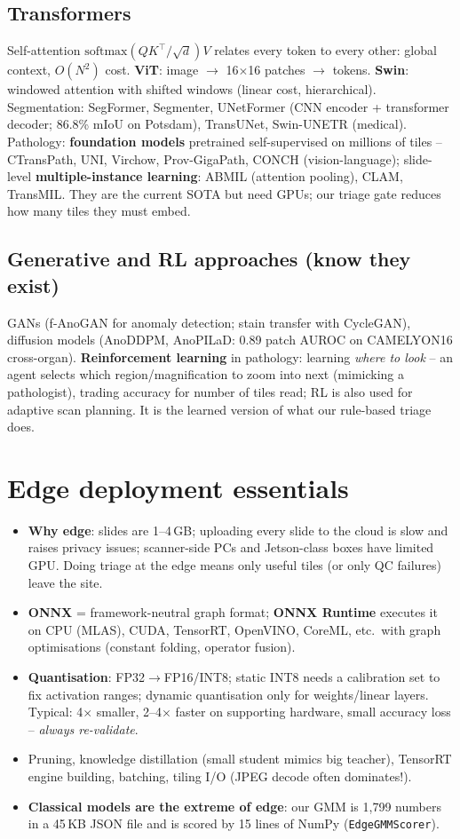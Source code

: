 \subsection{Transformers}
Self-attention $\mathrm{softmax}(QK^\top/\sqrt{d})V$ relates every token to every other: global context, $O(N^2)$ cost.
\textbf{ViT}: image $\to$ 16$\times$16 patches $\to$ tokens. \textbf{Swin}: windowed attention with shifted windows
(linear cost, hierarchical). Segmentation: SegFormer, Segmenter, UNetFormer (CNN encoder + transformer decoder;
86.8\% mIoU on Potsdam), TransUNet, Swin-UNETR (medical). Pathology: \textbf{foundation models} pretrained
self-supervised on millions of tiles -- CTransPath, UNI, Virchow, Prov-GigaPath, CONCH (vision-language); slide-level
\textbf{multiple-instance learning}: ABMIL (attention pooling), CLAM, TransMIL. They are the current SOTA but need GPUs;
our triage gate reduces how many tiles they must embed.

\subsection{Generative and RL approaches (know they exist)}
GANs (f-AnoGAN for anomaly detection; stain transfer with CycleGAN), diffusion models (AnoDDPM, AnoPILaD: 0.89 patch AUROC
on CAMELYON16 cross-organ). \textbf{Reinforcement learning} in pathology: learning \emph{where to look} -- an agent
selects which region/magnification to zoom into next (mimicking a pathologist), trading accuracy for number of tiles
read; RL is also used for adaptive scan planning. It is the learned version of what our rule-based triage does.

\section{Edge deployment essentials}
\begin{itemize}
\item \textbf{Why edge}: slides are 1--4\,GB; uploading every slide to the cloud is slow and raises privacy issues;
scanner-side PCs and Jetson-class boxes have limited GPU. Doing triage at the edge means only useful tiles (or only QC
failures) leave the site.
\item \textbf{ONNX} = framework-neutral graph format; \textbf{ONNX Runtime} executes it on CPU (MLAS), CUDA, TensorRT,
OpenVINO, CoreML, etc.\ with graph optimisations (constant folding, operator fusion).
\item \textbf{Quantisation}: FP32$\to$FP16/INT8; static INT8 needs a calibration set to fix activation ranges; dynamic
quantisation only for weights/linear layers. Typical: 4$\times$ smaller, 2--4$\times$ faster on supporting hardware,
small accuracy loss -- \emph{always re-validate}.
\item Pruning, knowledge distillation (small student mimics big teacher), TensorRT engine building, batching, tiling
I/O (JPEG decode often dominates!).
\item \textbf{Classical models are the extreme of edge}: our GMM is 1{,}799 numbers in a 45\,KB JSON file and is scored
by 15 lines of NumPy (\texttt{EdgeGMMScorer}).
\end{itemize}

